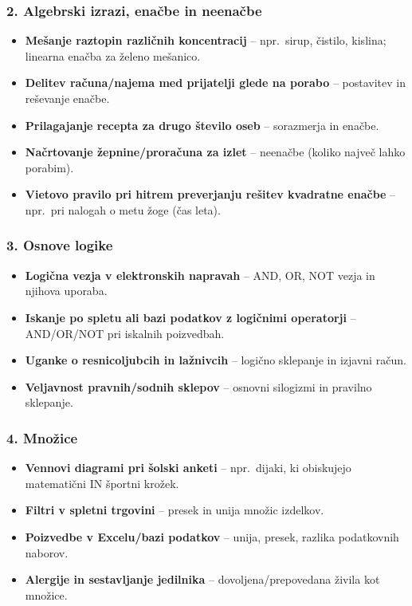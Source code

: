 \documentclass[11pt,a4paper]{article}
\begin{document}
\subsubsection*{2. Algebrski izrazi, enačbe in neenačbe}
\begin{itemize}
  \item \textbf{Mešanje raztopin različnih koncentracij} -- npr.\ sirup, čistilo, kislina; linearna enačba za želeno mešanico.
  \item \textbf{Delitev računa/najema med prijatelji glede na porabo} -- postavitev in reševanje enačbe.
  \item \textbf{Prilagajanje recepta za drugo število oseb} -- sorazmerja in enačbe.
  \item \textbf{Načrtovanje žepnine/proračuna za izlet} -- neenačbe (koliko največ lahko porabim).
  \item \textbf{Vietovo pravilo pri hitrem preverjanju rešitev kvadratne enačbe} -- npr.\ pri nalogah o metu žoge (čas leta).
\end{itemize}

\subsubsection*{3. Osnove logike}
\begin{itemize}
  \item \textbf{Logična vezja v elektronskih napravah} -- AND, OR, NOT vezja in njihova uporaba.
  \item \textbf{Iskanje po spletu ali bazi podatkov z logičnimi operatorji} -- AND/OR/NOT pri iskalnih poizvedbah.
  \item \textbf{Uganke o resnicoljubcih in lažnivcih} -- logično sklepanje in izjavni račun.
  \item \textbf{Veljavnost pravnih/sodnih sklepov} -- osnovni silogizmi in pravilno sklepanje.
\end{itemize}

\subsubsection*{4. Množice}
\begin{itemize}
  \item \textbf{Vennovi diagrami pri šolski anketi} -- npr.\ dijaki, ki obiskujejo matematični IN športni krožek.
  \item \textbf{Filtri v spletni trgovini} -- presek in unija množic izdelkov.
  \item \textbf{Poizvedbe v Excelu/bazi podatkov} -- unija, presek, razlika podatkovnih naborov.
  \item \textbf{Alergije in sestavljanje jedilnika} -- dovoljena/prepovedana živila kot množice.
\end{itemize}
\end{document}
